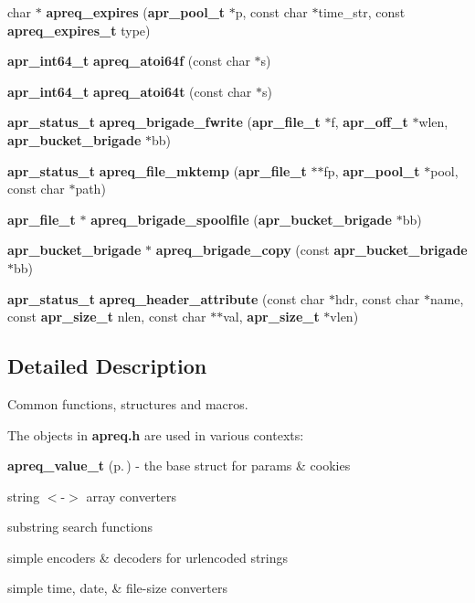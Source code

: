 \begin{CompactItemize}
\item 
char $\ast$ {\bf apreq\_\-expires} ({\bf apr\_\-pool\_\-t} $\ast$p, const char $\ast$time\_\-str, const {\bf apreq\_\-expires\_\-t} type)
\item 
{\bf apr\_\-int64\_\-t} {\bf apreq\_\-atoi64f} (const char $\ast$s)
\item 
{\bf apr\_\-int64\_\-t} {\bf apreq\_\-atoi64t} (const char $\ast$s)
\item 
{\bf apr\_\-status\_\-t} {\bf apreq\_\-brigade\_\-fwrite} ({\bf apr\_\-file\_\-t} $\ast$f, {\bf apr\_\-off\_\-t} $\ast$wlen, {\bf apr\_\-bucket\_\-brigade} $\ast$bb)
\item 
{\bf apr\_\-status\_\-t} {\bf apreq\_\-file\_\-mktemp} ({\bf apr\_\-file\_\-t} $\ast$$\ast$fp, {\bf apr\_\-pool\_\-t} $\ast$pool, const char $\ast$path)
\item 
{\bf apr\_\-file\_\-t} $\ast$ {\bf apreq\_\-brigade\_\-spoolfile} ({\bf apr\_\-bucket\_\-brigade} $\ast$bb)
\item 
{\bf apr\_\-bucket\_\-brigade} $\ast$ {\bf apreq\_\-brigade\_\-copy} (const {\bf apr\_\-bucket\_\-brigade} $\ast$bb)
\item 
{\bf apr\_\-status\_\-t} {\bf apreq\_\-header\_\-attribute} (const char $\ast$hdr, const char $\ast$name, const {\bf apr\_\-size\_\-t} nlen, const char $\ast$$\ast$val, {\bf apr\_\-size\_\-t} $\ast$vlen)
\end{CompactItemize}


\subsection{Detailed Description}
Common functions, structures and macros.

 The objects in {\bf apreq.h} are used in various contexts:

\begin{CompactItemize}
\item 
{\bf apreq\_\-value\_\-t} {\rm (p.\,\pageref{structapreq__value__t})} - the base struct for params \& cookies\item 
string $<$-$>$ array converters\item 
substring search functions\item 
simple encoders \& decoders for urlencoded strings\item 
simple time, date, \& file-size converters\end{CompactItemize}

